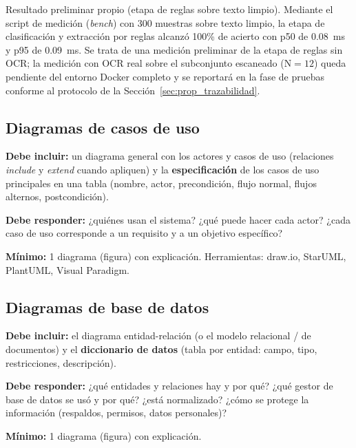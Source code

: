 
Resultado preliminar propio (etapa de reglas sobre texto limpio). Mediante el script de medici\'on (\textit{bench}) con 300 muestras sobre texto limpio, la etapa de clasificaci\'on y extracci\'on por reglas alcanz\'o 100\% de acierto con p50 de 0.08~ms y p95 de 0.09~ms. Se trata de una medici\'on preliminar de la etapa de reglas sin OCR; la medici\'on con OCR real sobre el subconjunto escaneado (N${=}12$) queda pendiente del entorno Docker completo y se reportar\'a en la fase de pruebas conforme al protocolo de la Secci\'on~\ref{sec:prop_trazabilidad}.


\subsection{Diagramas de casos de uso} \label{sec:casos_uso} %

\begin{guia}
\textbf{Debe incluir:} un diagrama general con los actores y casos de uso (relaciones \emph{include} y \emph{extend} cuando
apliquen) y la \textbf{especificación} de los casos de uso principales en una tabla (nombre, actor, precondición, flujo
normal, flujos alternos, postcondición).

\textbf{Debe responder:} ¿quiénes usan el sistema? ¿qué puede hacer cada actor? ¿cada caso de uso corresponde a un
requisito y a un objetivo específico?

\textbf{Mínimo:} 1 diagrama (figura) con explicación. Herramientas: draw.io, StarUML, PlantUML, Visual Paradigm.
\end{guia}



\subsection{Diagramas de base de datos} \label{sec:diagramas_bd} %

\begin{guia}
\textbf{Debe incluir:} el diagrama entidad-relación (o el modelo relacional / de documentos) y el
\textbf{diccionario de datos} (tabla por entidad: campo, tipo, restricciones, descripción).

\textbf{Debe responder:} ¿qué entidades y relaciones hay y por qué? ¿qué gestor de base de datos se usó y por qué? ¿está
normalizado? ¿cómo se protege la información (respaldos, permisos, datos personales)?

\textbf{Mínimo:} 1 diagrama (figura) con explicación.
\end{guia}

